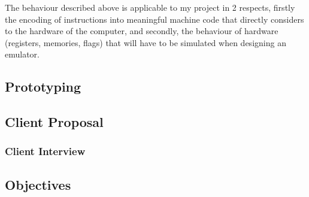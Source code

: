\bigskip


The behaviour described above is applicable to my project in 2 respects, firstly the encoding of instructions into meaningful machine code that directly considers to the hardware of the computer, and secondly, the behaviour of hardware (registers, memories, flags) that will have to be simulated when designing an emulator.
\subsection{Prototyping}
\subsection{Client Proposal}
\subsubsection{Client Interview}
\subsection{Objectives}